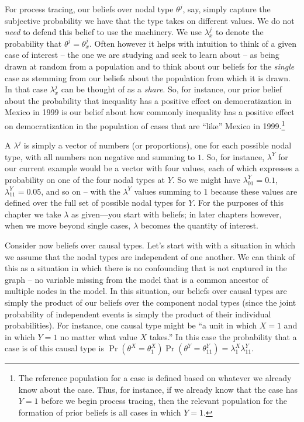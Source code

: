 \documentclass[
  12pt,
]{book}
\begin{document}
For process tracing, our beliefs over nodal type \(\theta^j\), say, simply capture the subjective probability we have that the type takes on different values. We do not \emph{need} to defend this belief to use the machinery. We use \(\lambda^j_x\) to denote the probability that \(\theta^j = \theta^j_x\). Often however it helps with intuition to think of a given case of interest -- the one we are studying and seek to learn about -- as being drawn at random from a population and to think about our beliefs for the \emph{single} case as stemming from our beliefs about the population from which it is drawn. In that case \(\lambda^j_x\) can be thought of as a \emph{share}. So, for instance, our prior belief about the probability that inequality has a positive effect on democratization in Mexico in 1999 is our belief about how commonly inequality has a positive effect on democratization in the population of cases that are ``like'' Mexico in 1999.\footnote{The reference population for a case is defined based on whatever we already know about the case. Thus, for instance, if we already know that the case has \(Y=1\) before we begin process tracing, then the relevant population for the formation of prior beliefs is all cases in which \(Y=1\).}

A \(\lambda^j\) is simply a vector of numbers (or proportions), one for each possible nodal type, with all numbers non negative and summing to \(1\). So, for instance, \(\lambda^Y\) for our current example would be a vector with four values, each of which expresses a probability on one of the four nodal types at \(Y\). So we might have \(\lambda^Y_{01}=0.1\), \(\lambda^Y_{11}=0.05\), and so on -- with the \(\lambda^Y\) values summing to \(1\) because these values are defined over the full set of possible nodal types for \(Y\). For the purposes of this chapter we take \(\lambda\) as given---you start with beliefs; in later chapters however, when we move beyond single cases, \(\lambda\) becomes the quantity of interest.

Consider now beliefs over causal types. Let's start with with a situation in which we assume that the nodal types are independent of one another. We can think of this as a situation in which there is no confounding that is not captured in the graph -- no variable missing from the model that is a common ancestor of multiple nodes in the model. In this situation, our beliefs over causal types are simply the product of our beliefs over the component nodal types (since the joint probability of independent events is simply the product of their individual probabilities). For instance, one causal type might be ``a unit in which \(X=1\) and in which \(Y=1\) no matter what value \(X\) takes.'' In this case the probability that a case is of this causal type is \(\Pr(\theta^X = \theta^X_1)\Pr(\theta^Y = \theta^Y_{11}) = \lambda^X_1\lambda^Y_{11}\).
\end{document}

